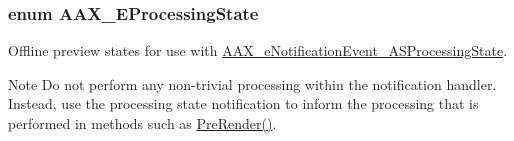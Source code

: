 \subsubsection[{A\+A\+X\+\_\+\+E\+Processing\+State}]{\setlength{\rightskip}{0pt plus 5cm}enum {\bf A\+A\+X\+\_\+\+E\+Processing\+State}}\label{a00206_a6ec854be40c8cf810dec97de3e56c0a7}


Offline preview states for use with \hyperlink{a00206_afab5ea2cfd731fc8f163b6caa685406eaa55c7e25741c0d4f81cc49394e96a43c}{A\+A\+X\+\_\+e\+Notification\+Event\+\_\+\+A\+S\+Processing\+State}. 

\begin{DoxyNote}{Note}
Do not perform any non-\/trivial processing within the notification handler. Instead, use the processing state notification to inform the processing that is performed in methods such as \hyperlink{a00020_afb0d1b047d76ab4ad2df2618111fc2c6}{Pre\+Render()}. 
\end{DoxyNote}
